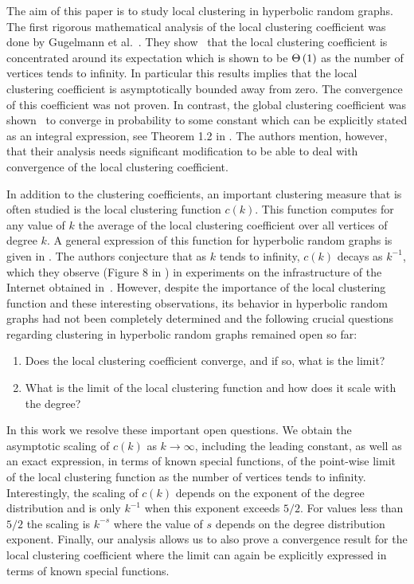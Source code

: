The aim of this paper is to study local clustering in hyperbolic random graphs. The first rigorous mathematical analysis of the local clustering coefficient was done by Gugelmann et al.~\cite{gugelmann2012random}. They show~\cite[Theorem 2.1]{gugelmann2012random} that the local clustering coefficient is concentrated around its expectation which is shown to be $\Theta\left(1\right)$ as the number of vertices tends to infinity. In particular this results implies that the local clustering coefficient is asymptotically bounded away from zero. The convergence of this coefficient was not proven. In contrast, the global clustering coefficient was shown~\cite{candellero2016clustering} to converge in probability to some constant which can be explicitly stated as an integral expression, see Theorem 1.2 in \cite{candellero2016clustering}. The authors mention, however, that their analysis needs significant modification to be able to deal with convergence of the local clustering coefficient.



In addition to the clustering coefficients, an important clustering measure that is often studied is the local clustering function $c(k)$. This function computes for any value of $k$ the average of the local clustering coefficient over all vertices of degree $k$. A general expression of this function for hyperbolic random graphs is given in \cite[Equation (59)]{krioukov2010hyperbolic}. The authors conjecture that as $k$ tends to infinity, $c(k)$ decays as $k^{-1}$, which they observe (Figure 8 in \cite{krioukov2010hyperbolic}) in experiments on the infrastructure of the Internet obtained in~\cite{claffy2009internet}. However, despite the importance of the local clustering function and these interesting observations, its behavior in hyperbolic random graphs had not been completely determined and the following crucial questions regarding clustering in hyperbolic random graphs remained open so far:
\begin{enumerate}[\upshape 1)]
\item Does the local clustering coefficient converge, and if so, what is the limit?
\item What is the limit of the local clustering function and how does it scale with the degree?
\end{enumerate}

In this work we resolve these important open questions. We obtain the asymptotic scaling of $c(k)$ as $k \to \infty$, including the leading constant, as well as an exact expression, in terms of known special functions, of the point-wise limit of the local clustering function as the number of vertices tends to infinity. Interestingly, the scaling of $c(k)$ depends on the exponent of the degree distribution and is only $k^{-1}$ when this exponent exceeds $5/2$. For values less than $5/2$ the scaling is $k^{-s}$ where the value of $s$ depends on the degree distribution exponent. Finally, our analysis allows us to also prove a convergence result for the local clustering coefficient where the limit can again be explicitly expressed in terms of known special functions. 

